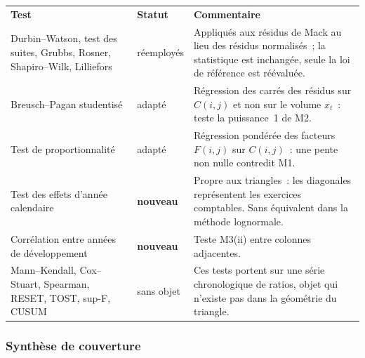 \documentclass[a4paper,11pt]{article}
\begin{document}
\begin{center}
\small
{}
\begin{tabular}{@{}p{4.9cm}p{2.3cm}p{7.6cm}@{}}
\rowcolor{tableheader}
\textcolor{financeblue}{\textbf{Test}} &
\textcolor{financeblue}{\textbf{Statut}} &
\textcolor{financeblue}{\textbf{Commentaire}} \\
Durbin--Watson, test des suites, Grubbs, Rosner, Shapiro--Wilk, Lilliefors &
réemployés & Appliqués aux résidus de Mack au lieu des résidus normalisés~; la
statistique est inchangée, seule la loi de référence est réévaluée. \\
Breusch--Pagan studentisé & adapté & Régression des carrés des résidus sur
$C(i,j)$ et non sur le volume $x_t$~: teste la puissance~1 de M2. \\
Test de proportionnalité & adapté & Régression pondérée des facteurs $F(i,j)$
sur $C(i,j)$~: une pente non nulle contredit M1. \\
Test des effets d'année calendaire & \textbf{nouveau} & Propre aux triangles~:
les diagonales représentent les exercices comptables. Sans équivalent dans la
méthode lognormale. \\
Corrélation entre années de développement & \textbf{nouveau} & Teste M3(ii)
entre colonnes adjacentes. \\
Mann--Kendall, Cox--Stuart, Spearman, RESET, TOST, sup-F, CUSUM &
sans objet & Ces tests portent sur une série chronologique de ratios, objet qui
n'existe pas dans la géométrie du triangle. \\
\end{tabular}
\end{center}

\subsubsection*{Synthèse de couverture}
\end{document}
